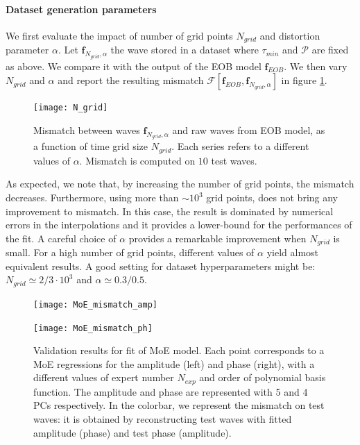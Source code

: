 \paragraph{Dataset generation parameters}
We first evaluate the impact of number of grid points $N_{grid}$ and distortion parameter $\alpha$.
Let $\mathbf{f}_{N_{grid}, \alpha}$ the wave stored in a dataset where $\tau_{min}$ and $\mathcal{P}$ are fixed as above. We compare it with the output of the EOB model $\mathbf{f}_{EOB}$.
We then vary $N_{grid}$ and $\alpha$ and report the resulting mismatch $\mathcal{F}[\mathbf{f}_{EOB}, \mathbf{f}_{N_{grid}, \alpha}]$ in figure \ref{fig:N_grid}.
\begin{figure}[!t]
	\centering
	\texttt{[image: N\_grid]}
	\caption{Mismatch between waves $\mathbf{f}_{N_{grid}, \alpha}$ and raw waves from EOB model, as a function of time grid size $N_{grid}$. Each series refers to a different values of $\alpha$.
Mismatch is computed on $10$ test waves. 
}
	\label{fig:N_grid}
\end{figure}
\par
As expected, we note that, by increasing the number of grid points, the mismatch decreases. Furthermore, using more than $\sim 10^3$ grid points, does not bring any improvement to mismatch. In this case, the result is dominated by numerical errors in the interpolations and it provides a lower-bound for the performances of the fit.
A careful choice of $\alpha$ provides a remarkable improvement when $N_{grid}$ is small. For a high number of grid points, different values of $\alpha$ yield almost equivalent results.
A good setting for dataset hyperparameters might be: $N_{grid} \simeq 2/3 \cdot 10^{3}$ and $\alpha \simeq 0.3/0.5$.
\begin{figure}[!t]
	\centering
    \begin{minipage}{.5\linewidth}
        \centering
        \texttt{[image: MoE\_mismatch\_amp]}
    \end{minipage}\hfill
    \begin{minipage}{.5\linewidth}
        \centering
        \texttt{[image: MoE\_mismatch\_ph]}
    \end{minipage}
	\caption{Validation results for fit of MoE model. Each point corresponds to a MoE regressions for the amplitude (left) and phase (right), with a different values of expert number $N_{exp}$ and order of polynomial basis function.
The amplitude and phase are represented with 5 and 4 PCs respectively.
In the colorbar, we represent the mismatch on test waves: it is obtained by reconstructing test waves with fitted amplitude (phase) and test phase (amplitude).
}
	\label{fig:MoE_test}
\end{figure}


